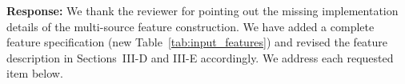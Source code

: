 %

%
\textbf{Response:} We thank the reviewer for pointing out the missing
implementation details of the multi-source feature construction. We have
added a complete feature specification (new Table~\ref{tab:input_features})
and revised the feature description in Sections~III-D and III-E accordingly.
We address each requested item below.

